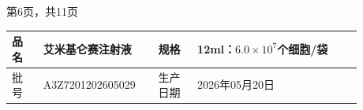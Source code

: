 \documentclass[UTF8,10pt,a4paper,fontset=fandol]{ctexart}
\newcommand{\fieldvalue}[1]{#1}
\begin{document}
第6页，共11页

\newpage

\begin{center}
\small
\begin{tabular}{|p{0.08\linewidth}|p{0.28\linewidth}|p{0.10\linewidth}|p{0.42\linewidth}|}
\hline
品名 &
\fieldvalue{艾米基仑赛注射液} &
规格 &
\fieldvalue{12ml：$6.0\times10^{7}$个细胞/袋}
\\ \hline
批号 &
\fieldvalue{A3Z7201202605029} &
生产日期 &
\fieldvalue{2026年05月20日}
\\ \hline
\end{tabular}

\vspace{2mm}


\end{center}
\end{document}
